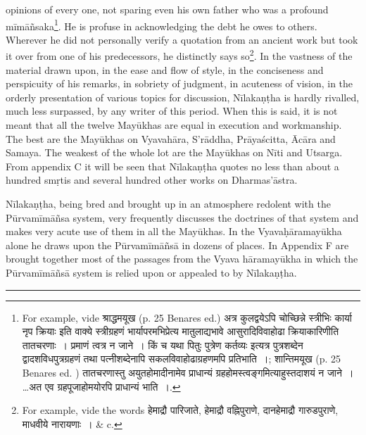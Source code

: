 \documentclass[11pt, openany]{book}
\begin{document}
\noindent
opinions of every one, not sparing even his own father who was a profound mīmāñsaka\renewcommand{\thefootnote}{1}\footnote{For example, vide श्राद्धमयूख (p. 25 Benares ed.) अत्र
{\qt कुलद्वयेऽपि चोच्छिन्ने स्त्रीभिः कार्या नृप क्रियाः} इति वाक्ये स्त्रीग्रहणं भार्यापरमभिप्रेत्य मातुलाद्यभावे आसुरादिविवाहोढा क्रियाकारिणीति तातचरणाः~। प्रमाणं त्वत्र न जाने~। किं च यथा {\qt पितुः पुत्रेण कर्तव्यः} इत्यत्र पुत्रशब्देन द्वादशविधपुत्रग्रहणं तथा पत्नीशब्देनापि सकलविवाहोढाग्रहणमपि प्रतिभाति~।; शान्तिमयूख (p. 25 Benares ed. ) {\qt तातचरणास्तु अयुतहोमादीनामेव प्राधान्यं ग्रहहोमस्त्वङ्गमित्याहुस्तदाशयं न जाने~। \ldots अत एव ग्रहपूजाहोमयोरपि प्राधान्यं भाति~।}.}. He is profuse in acknowledging the debt he owes to others. Wherever he did not personally verify a quotation from an ancient work but took it over from one of his predecessors, he distinctly says so\renewcommand{\thefootnote}{2}\footnote{For example, vide the words {\qt हेमाद्रौ पारिजाते, हेमाद्रौ वह्निपुराणे, दानहेमाद्रौ गारुडपुराणे, माधवीये नारायणाः~।} \& c.}. In the vastness of the material drawn upon, in the ease and flow of style, in the conciseness and perspicuity of his remarks, in sobriety of judgment, in acuteness of vision, in the orderly presentation of various topics for discussion, Nīlakaṇṭha is hardly rivalled, much less surpassed, by any writer of this period. When this is said, it is not meant that all the twelve Mayūkhas are equal in execution and workmanship. The best are the Mayūkhas on Vyavahāra, S'rāddha, Prāyaścitta, Ācāra and Samaya. The weakest of the whole lot are the Mayūkhas on Nīti and Utsarga. From appendix C it will be seen that Nīlakaṇṭha quotes no less than about a hundred smṛtis and several hundred other works on Dharmas'āstra.

Nīlakaṇṭha, being bred and brought up in an atmosphere redolent with the Pūrvamīmāñsa system, very frequently discusses the doctrines of that system and makes very acute use of them in all the Mayūkhas. In the Vyavaḥāramayūkha alone he draws upon the Pūrvamīmāñsā in dozens of places. In Appendix F are brought together most of the passages from the Vyava hāramayūkha in which the Pūrvamīmāñsā system is relied upon or appealed to by Nīlakaṇṭha.

\vspace{-5mm}
\begin{center}
\rule{0.2\linewidth}{0.5pt}
\end{center}

\newpage
\end{document}
